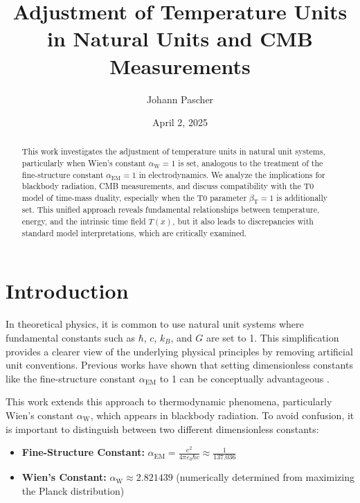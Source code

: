 \documentclass[12pt,a4paper]{article}
\newcommand{\Tfield}{T(x)}
\newcommand{\betaT}{\beta_{\text{T}}}
\newcommand{\alphaEM}{\alpha_{\text{EM}}}
\newcommand{\alphaW}{\alpha_{\text{W}}}
\begin{document}
	
	\title{Adjustment of Temperature Units in Natural Units and CMB Measurements}
	\author{Johann Pascher}
	\date{April 2, 2025}
	
	\maketitle
	
	\begin{abstract}
		This work investigates the adjustment of temperature units in natural unit systems, particularly when Wien’s constant \(\alphaW = 1\) is set, analogous to the treatment of the fine-structure constant \(\alphaEM = 1\) in electrodynamics. We analyze the implications for blackbody radiation, CMB measurements, and discuss compatibility with the T0 model of time-mass duality, especially when the T0 parameter \(\betaT = 1\) is additionally set. This unified approach reveals fundamental relationships between temperature, energy, and the intrinsic time field \(\Tfield\), but it also leads to discrepancies with standard model interpretations, which are critically examined.
	\end{abstract}
	
	\tableofcontents
	\newpage
	
	\section{Introduction}
	
	In theoretical physics, it is common to use natural unit systems where fundamental constants such as \(\hbar\), \(c\), \(k_B\), and \(G\) are set to 1. This simplification provides a clearer view of the underlying physical principles by removing artificial unit conventions. Previous works have shown that setting dimensionless constants like the fine-structure constant \(\alphaEM\) to 1 can be conceptually advantageous \cite{pascher_alpha_2025}.
	
	This work extends this approach to thermodynamic phenomena, particularly Wien’s constant \(\alphaW\), which appears in blackbody radiation. To avoid confusion, it is important to distinguish between two different dimensionless constants:
	
	\begin{tcolorbox}[colback=blue!5!white,colframe=blue!75!black,title=Key Dimensionless Constants]
		\begin{itemize}
			\item \textbf{Fine-Structure Constant:} \(\alphaEM = \frac{e^2}{4\pi\varepsilon_0 \hbar c} \approx \frac{1}{137.036}\)
			\item \textbf{Wien’s Constant:} \(\alphaW \approx 2.821439\) (numerically determined from maximizing the Planck distribution)
		\end{itemize}
	\end{tcolorbox}
	
\end{document}
